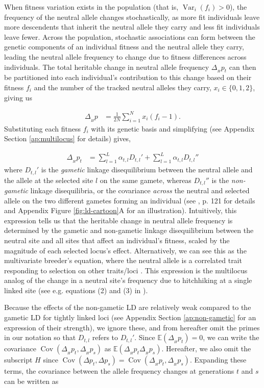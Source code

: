 \documentclass[11pt]{article}
\newcommand{\E}{\mathbb{E}}
\DeclareMathOperator{\var}{Var}
\DeclareMathOperator{\cov}{Cov}
\begin{document}
When fitness variation exists in the population (that is, $\var_i(f_i) > 0$),
the frequency of the neutral allele changes stochastically, as more fit
individuals leave more descendents that inherit the neutral allele they carry
and less fit individuals leave fewer. Across the population, stochastic
associations can form between the genetic components of an individual fitness
and the neutral allele they carry, leading the neutral allele frequency to
change due to fitness differences across individuals. The total heritable
change in neutral allele frequency $\Delta_{_H} p_t$ can then be partitioned
into each individual's contribution to this change based on their fitness $f_i$
and the number of the tracked neutral alleles they carry, $x_i \in \{0, 1,
2\}$, giving us

\begin{align}
  \Delta_{_H} p &= \frac{1}{2N} \sum_{i=1}^N x_i (f_i - 1).
\end{align}
%
Substituting each fitness $f_i$ with its genetic basis and simplifying (see
Appendix Section \ref{ap:multilocus} for details) gives,

\begin{align}
  \Delta_{_H} p_t &=  \sum_{l=1}^L \alpha_{t,l} D_{t,l}' + \sum_{l=1}^L \alpha_{t,l} D_{t,l}'' 
\label{eq:neut-change}
\end{align}
%
where $D_{t,l}'$ is the \emph{gametic} linkage disequilibrium between the
neutral allele and the allele at the selected site $l$ on the same gamete,
whereas $D_{t,l}''$ is the \emph{non-gametic} linkage disequilibria, or the
covariance \emph{across} the neutral and selected allele on the two different
gametes forming an individual (see \cite{Weir1996-mv}, p. 121 for details and
Appendix Figure \ref{fig:ld-cartoon}A for an illustration). Intuitively, this
expression tells us that the heritable change in neutral allele frequency is
determined by the gametic and non-gametic linkage disequilibrium between the
neutral site and all sites that affect an individual's fitness, scaled by the
magnitude of each selected locus's effect. Alternatively, we can see this as
the multivariate breeder's equation, where the neutral allele is a correlated
trait responding to selection on other traits/loci \parencite{Lande1983-ok}.
This expression is the multilocus analog of the change in a neutral site's
frequency due to hitchhiking at a single linked site (see e.g. equations (2)
and (3) in \cite{Stephan2006-xz}). 

Because the effects of the non-gametic LD are relatively weak compared to the
gametic LD for tightly linked loci (see Appendix Section \ref{ap:non-gametic}
for an expression of their strength), we ignore these, and from hereafter omit
the primes in our notation so that $D_{t,l}$ refers to $D_{t,l}'$.  Since
$\E(\Delta_{_H} p_t) = 0$, we can write the covariance $\cov(\Delta_{_H} p_t,
\Delta_{_H} p_s)$ as $\E(\Delta_{_H} p_t \Delta_{_H} p_s)$.  Hereafter, we also
omit the subscript $H$ since $\cov(\Delta p_t, \Delta p_s) = \cov(\Delta_{_H}
p_t, \Delta_{_H} p_s)$. Expanding these terms, the covariance between the
allele frequency changes at generations $t$ and $s$ can be written as
\end{document}
